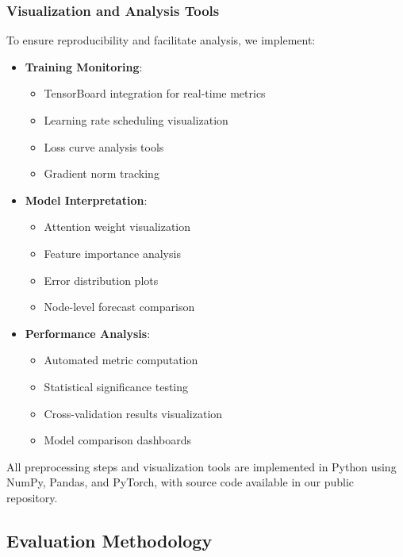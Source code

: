 \documentclass[lettersize, journal]{IEEEtran}
\begin{document}
\subsubsection{Visualization and Analysis Tools}
To ensure reproducibility and facilitate analysis, we implement:

\begin{itemize}
    \item \textbf{Training Monitoring}:
    \begin{itemize}
        \item TensorBoard integration for real-time metrics
        \item Learning rate scheduling visualization
        \item Loss curve analysis tools
        \item Gradient norm tracking
    \end{itemize}
    
    \item \textbf{Model Interpretation}:
    \begin{itemize}
        \item Attention weight visualization
        \item Feature importance analysis
        \item Error distribution plots
        \item Node-level forecast comparison
    \end{itemize}
    
    \item \textbf{Performance Analysis}:
    \begin{itemize}
        \item Automated metric computation
        \item Statistical significance testing
        \item Cross-validation results visualization
        \item Model comparison dashboards
    \end{itemize}
\end{itemize}

All preprocessing steps and visualization tools are implemented in Python using NumPy, Pandas, and PyTorch, with source code available in our public repository.

\subsection{Evaluation Methodology}
\end{document}
